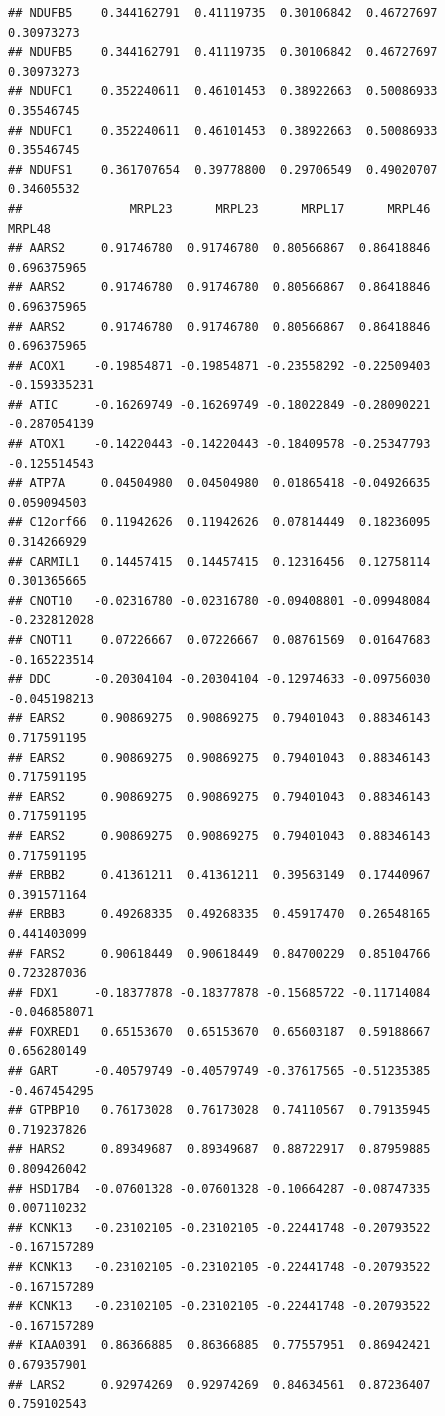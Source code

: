 \documentclass[
]{article}
\begin{document}
\begin{verbatim}
## NDUFB5    0.344162791  0.41119735  0.30106842  0.46727697  0.30973273
## NDUFB5    0.344162791  0.41119735  0.30106842  0.46727697  0.30973273
## NDUFC1    0.352240611  0.46101453  0.38922663  0.50086933  0.35546745
## NDUFC1    0.352240611  0.46101453  0.38922663  0.50086933  0.35546745
## NDUFS1    0.361707654  0.39778800  0.29706549  0.49020707  0.34605532
##               MRPL23      MRPL23      MRPL17      MRPL46       MRPL48
## AARS2     0.91746780  0.91746780  0.80566867  0.86418846  0.696375965
## AARS2     0.91746780  0.91746780  0.80566867  0.86418846  0.696375965
## AARS2     0.91746780  0.91746780  0.80566867  0.86418846  0.696375965
## ACOX1    -0.19854871 -0.19854871 -0.23558292 -0.22509403 -0.159335231
## ATIC     -0.16269749 -0.16269749 -0.18022849 -0.28090221 -0.287054139
## ATOX1    -0.14220443 -0.14220443 -0.18409578 -0.25347793 -0.125514543
## ATP7A     0.04504980  0.04504980  0.01865418 -0.04926635  0.059094503
## C12orf66  0.11942626  0.11942626  0.07814449  0.18236095  0.314266929
## CARMIL1   0.14457415  0.14457415  0.12316456  0.12758114  0.301365665
## CNOT10   -0.02316780 -0.02316780 -0.09408801 -0.09948084 -0.232812028
## CNOT11    0.07226667  0.07226667  0.08761569  0.01647683 -0.165223514
## DDC      -0.20304104 -0.20304104 -0.12974633 -0.09756030 -0.045198213
## EARS2     0.90869275  0.90869275  0.79401043  0.88346143  0.717591195
## EARS2     0.90869275  0.90869275  0.79401043  0.88346143  0.717591195
## EARS2     0.90869275  0.90869275  0.79401043  0.88346143  0.717591195
## EARS2     0.90869275  0.90869275  0.79401043  0.88346143  0.717591195
## ERBB2     0.41361211  0.41361211  0.39563149  0.17440967  0.391571164
## ERBB3     0.49268335  0.49268335  0.45917470  0.26548165  0.441403099
## FARS2     0.90618449  0.90618449  0.84700229  0.85104766  0.723287036
## FDX1     -0.18377878 -0.18377878 -0.15685722 -0.11714084 -0.046858071
## FOXRED1   0.65153670  0.65153670  0.65603187  0.59188667  0.656280149
## GART     -0.40579749 -0.40579749 -0.37617565 -0.51235385 -0.467454295
## GTPBP10   0.76173028  0.76173028  0.74110567  0.79135945  0.719237826
## HARS2     0.89349687  0.89349687  0.88722917  0.87959885  0.809426042
## HSD17B4  -0.07601328 -0.07601328 -0.10664287 -0.08747335  0.007110232
## KCNK13   -0.23102105 -0.23102105 -0.22441748 -0.20793522 -0.167157289
## KCNK13   -0.23102105 -0.23102105 -0.22441748 -0.20793522 -0.167157289
## KCNK13   -0.23102105 -0.23102105 -0.22441748 -0.20793522 -0.167157289
## KIAA0391  0.86366885  0.86366885  0.77557951  0.86942421  0.679357901
## LARS2     0.92974269  0.92974269  0.84634561  0.87236407  0.759102543

\end{verbatim}
\end{document}
